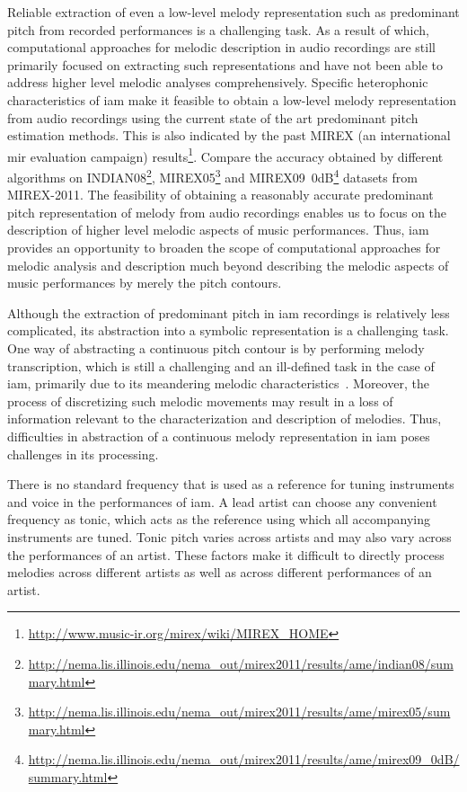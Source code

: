 Reliable extraction of even a low-level melody representation such as predominant pitch from recorded performances is a challenging task. As a result of which, computational approaches for melodic description in audio recordings are still primarily focused on extracting such representations and have not been able to address higher level melodic analyses comprehensively. Specific heterophonic characteristics of \gls{iam} make it feasible to obtain a low-level melody representation from audio recordings using the current state of the art predominant pitch estimation methods. This is also indicated by the past MIREX (an international \gls{mir} evaluation campaign) results\footnote{\url{http://www.music-ir.org/mirex/wiki/MIREX_HOME}}. Compare the accuracy obtained by different algorithms on INDIAN08\footnote{\url{http://nema.lis.illinois.edu/nema_out/mirex2011/results/ame/indian08/summary.html}}, MIREX05\footnote{\url{http://nema.lis.illinois.edu/nema_out/mirex2011/results/ame/mirex05/summary.html}} and MIREX09~0dB\footnote{\url{http://nema.lis.illinois.edu/nema_out/mirex2011/results/ame/mirex09_0dB/summary.html}} datasets from MIREX-2011. The feasibility of obtaining a reasonably accurate predominant pitch representation of melody from audio recordings enables us to focus on the description of higher level melodic aspects of music performances. Thus, \gls{iam} provides an opportunity to broaden the scope of computational approaches for melodic analysis and description much beyond describing the melodic aspects of music performances by merely the pitch contours.

Although the extraction of predominant pitch in \gls{iam} recordings is relatively less complicated, its abstraction into a symbolic representation is a challenging task. One way of abstracting a continuous pitch contour is by performing melody transcription, which is still a challenging and an ill-defined task in the case of \gls{iam}, primarily due to its meandering melodic characteristics~\citep{widdess1994involving,rao1999raga}. Moreover, the process of discretizing such melodic movements may result in a loss of information relevant to the characterization and description of melodies. Thus, difficulties in abstraction of a continuous melody representation in \gls{iam} poses challenges in its processing. 

There is no standard frequency that is used as a reference for tuning instruments and voice in the performances of \gls{iam}. A lead artist can choose any convenient frequency as tonic, which acts as the reference using which all accompanying instruments are tuned. Tonic pitch varies across artists and may also vary across the performances of an artist. These factors make it difficult to directly process melodies across different artists as well as across different performances of an artist.

